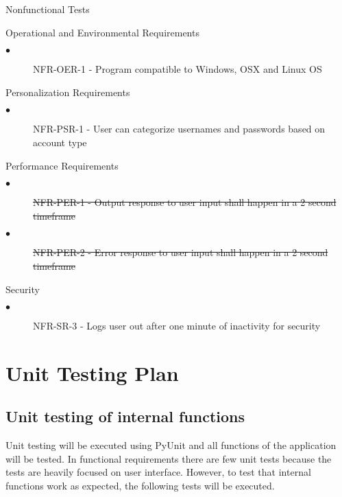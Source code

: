 \documentclass[12pt, titlepage]{article}
\begin{document}
Nonfunctional Tests
\begin{description}
    \item Operational and Environmental Requirements
    \begin{description}
          \item[$\bullet$] NFR-OER-1 - Program compatible to Windows, OSX and Linux OS
    \end{description}
    \item Personalization Requirements
    \begin{description}
          \item[$\bullet$] NFR-PSR-1 - User can categorize usernames and passwords based on account type
    \end{description}
    \item{Performance Requirements}
    \begin{description}
          \item[$\bullet$] \sout{NFR-PER-1 - Output response to user input shall happen in a 2 second timeframe}
          \item[$\bullet$] \sout{NFR-PER-2 - Error response to user input shall happen in a 2 second timeframe}
    \end{description}
    \item{Security}
    \begin{description}
          \item[$\bullet$] NFR-SR-3 - Logs user out after one minute of inactivity for security
    \end{description}
\end{description}

\section{Unit Testing Plan}
		
\subsection{Unit testing of internal functions}
		
Unit testing will be executed using PyUnit and all functions of the application will be tested. In functional requirements there are few unit tests because the tests are heavily focused on user interface. However, to test that internal functions work as expected, the following tests will be executed.
\end{document}
